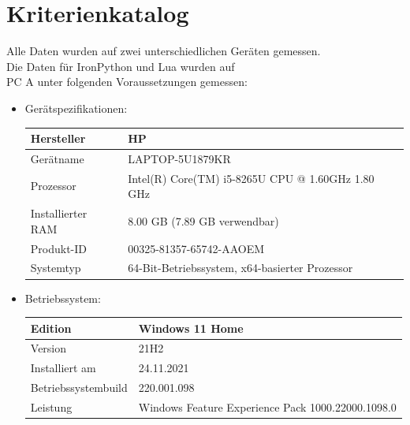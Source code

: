 \section{Kriterienkatalog}
Alle Daten wurden auf zwei unterschiedlichen Geräten gemessen. \\
Die Daten für IronPython und Lua wurden auf \\
PC A unter folgenden Voraussetzungen  gemessen:
\begin{itemize}
    \item Gerätspezifikationen:
    \begin{table}[H]
        \center
        \begin{tabular}{|p{3cm}|p{3cm}|}
            \hline
            Hersteller & HP \\ \hline
            Gerätname & LAPTOP-5U1879KR \\ \hline
            Prozessor & Intel(R) Core(TM) i5-8265U CPU @ 1.60GHz   1.80 GHz \\ \hline
            Installierter RAM & 8.00 GB (7.89 GB verwendbar) \\ \hline
            Produkt-ID & 00325-81357-65742-AAOEM \\ \hline
            Systemtyp & 64-Bit-Betriebssystem, x64-basierter Prozessor \\ \hline
        \end{tabular}
    \end{table}
    \item Betriebssystem:
    \begin{table}[H]
        \center
        \begin{tabular}{|p{4cm}|p{4cm}|}
            \hline
            Edition & Windows 11 Home \\ \hline
            Version & 21H2 \\ \hline
            Installiert am & 24.11.2021 \\ \hline
            Betriebssystembuild & 220.001.098 \\ \hline
            Leistung & Windows Feature Experience Pack 1000.22000.1098.0 \\ \hline
        \end{tabular}        
    \end{table}
\end{itemize}

